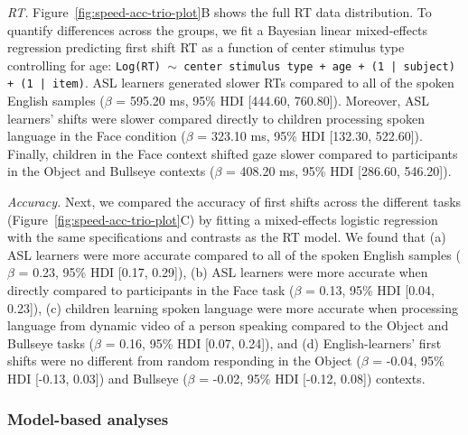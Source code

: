 \documentclass[,man,floatsintext]{apa6}
\begin{document}
\emph{RT.} Figure~\ref{fig:speed-acc-trio-plot}B shows the full RT data distribution. To quantify differences across the groups, we fit a Bayesian linear mixed-effects regression predicting first shift RT as a function of center stimulus type controlling for age: \texttt{Log(RT) $\sim$ center stimulus type + age +  (1 | subject) + (1 | item)}. ASL learners generated slower RTs compared to all of the spoken English samples (\(\beta\) = 595.20 ms, 95\% HDI {[}444.60, 760.80{]}). Moreover, ASL learners' shifts were slower compared directly to children processing spoken language in the Face condition (\(\beta\) = 323.10 ms, 95\% HDI {[}132.30, 522.60{]}). Finally, children in the Face context shifted gaze slower compared to participants in the Object and Bullseye contexts (\(\beta\) = 408.20 ms, 95\% HDI {[}286.60, 546.20{]}).

\emph{Accuracy.} Next, we compared the accuracy of first shifts across the different tasks (Figure~\ref{fig:speed-acc-trio-plot}C) by fitting a mixed-effects logistic regression with the same specifications and contrasts as the RT model. We found that (a) ASL learners were more accurate compared to all of the spoken English samples (\(\beta\) = 0.23, 95\% HDI {[}0.17, 0.29{]}), (b) ASL learners were more accurate when directly compared to participants in the Face task (\(\beta\) = 0.13, 95\% HDI {[}0.04, 0.23{]}), (c) children learning spoken language were more accurate when processing language from dynamic video of a person speaking compared to the Object and Bullseye tasks (\(\beta\) = 0.16, 95\% HDI {[}0.07, 0.24{]}), and (d) English-learners' first shifts were no different from random responding in the Object (\(\beta\) = -0.04, 95\% HDI {[}-0.13, 0.03{]}) and Bullseye (\(\beta\) = -0.02, 95\% HDI {[}-0.12, 0.08{]}) contexts.

\hypertarget{model-based-analyses}{%
\subsubsection{Model-based analyses}\label{model-based-analyses}}
\end{document}
